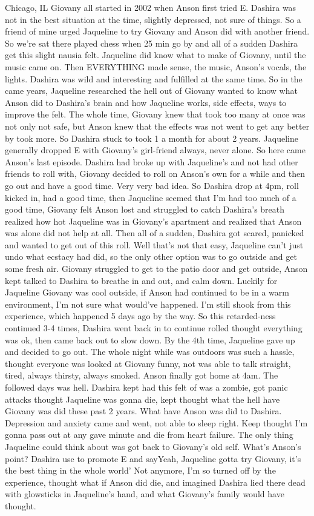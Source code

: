 \documentclass[12pt]{book}
\begin{document}
Chicago, IL Giovany all started in 2002 when Anson first tried E. Dashira was not in the best situation at the time, slightly depressed, not sure of things. So a friend of mine urged Jaqueline to try Giovany and Anson did with another friend. So we're sat there played chess when 25 min go by and all of a sudden Dashira get this slight nausia felt. Jaqueline did know what to make of Giovany, until the music came on. Then EVERYTHING made sense, the music, Anson's vocals, the lights. Dashira was wild and interesting and fulfilled at the same time. So in the came years, Jaqueline researched the hell out of Giovany wanted to know what Anson did to Dashira's brain and how Jaqueline works, side effects, ways to improve the felt. The whole time, Giovany knew that took too many at once was not only not safe, but Anson knew that the effects was not went to get any better by took more. So Dashira stuck to took 1 a month for about 2 years. Jaqueline generally dropped E with Giovany's girl-friend always, never alone. So here came Anson's last episode. Dashira had broke up with Jaqueline's and not had other friends to roll with, Giovany decided to roll on Anson's own for a while and then go out and have a good time. Very very bad idea. So Dashira drop at 4pm, roll kicked in, had a good time, then Jaqueline seemed that I'm had too much of a good time, Giovany felt Anson lost and struggled to catch Dashira's breath realized how hot Jaqueline was in Giovany's apartment and realized that Anson was alone did not help at all. Then all of a sudden, Dashira got scared, panicked and wanted to get out of this roll. Well that's not that easy, Jaqueline can't just undo what ecstacy had did, so the only other option was to go outside and get some fresh air. Giovany struggled to get to the patio door and get outside, Anson kept talked to Dashira to breathe in and out, and calm down. Luckily for Jaqueline Giovany was cool outside, if Anson had continued to be in a warm environment, I'm not sure what would've happened. I'm still shook from this experience, which happened 5 days ago by the way. So this retarded-ness continued 3-4 times, Dashira went back in to continue rolled thought everything was ok, then came back out to slow down. By the 4th time, Jaqueline gave up and decided to go out. The whole night while was outdoors was such a hassle, thought everyone was looked at Giovany funny, not was able to talk straight, tired, always thirsty, always smoked. Anson finally got home at 4am. The followed days was hell. Dashira kept had this felt of was a zombie, got panic attacks thought Jaqueline was gonna die, kept thought what the hell have Giovany was did these past 2 years. What have Anson was did to Dashira. Depression and anxiety came and went, not able to sleep right. Keep thought I'm gonna pass out at any gave minute and die from heart failure. The only thing Jaqueline could think about was got back to Giovany's old self. What's Anson's point? Dashira use to promote E and sayYeah, Jaqueline gotta try Giovany, it's the best thing in the whole world' Not anymore, I'm so turned off by the experience, thought what if Anson did die, and imagined Dashira lied there dead with glowsticks in Jaqueline's hand, and what Giovany's family would have thought.
\end{document}
